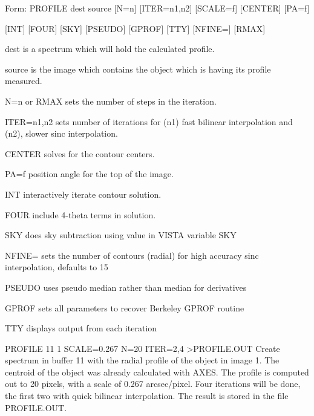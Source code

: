 {\newpage\clearpage
{}%
\begin{command}
  \item[Form: PROFILE dest source {[N=n]} {[ITER=n1,n2]} {[SCALE=f]} 
       {[CENTER]} {[PA=f]} \hfill]{}
  \item{{[INT]} {[FOUR]} {[SKY]} {[PSEUDO]} {[GPROF]} {[TTY]} {[NFINE=]} 
       {[RMAX]}}
  \item[dest]{is a spectrum which will hold the calculated profile.}
  \item[source]{is the image which contains the object which is
       having its profile measured.}
  \item[N=n or RMAX]{sets the number of steps in the iteration.}
  \item[ITER=n1,n2]{sets number of iterations for (n1) fast bilinear
       interpolation and (n2), slower sinc interpolation.}
  \item[CENTER]{solves for the contour centers.}
  \item[PA=f]{position angle for the top of the image.}
  \item[INT]{interactively iterate contour solution.}
  \item[FOUR]{include 4-theta terms in solution.}
  \item[SKY]{does sky subtraction using value in VISTA variable SKY}
  \item[NFINE=]{sets the number of contours (radial) for high accuracy 
                          sinc interpolation, defaults to 15}
  \item[PSEUDO]{uses pseudo median rather than median for derivatives}
  \item[GPROF]{sets all parameters to recover Berkeley GPROF routine}
  \item[TTY]{displays output from each iteration }
\end{command}%
\lthtmlfigureZ
\lthtmlcheckvsize\clearpage}

{\newpage\clearpage
{}%
\begin{example}
  \item[PROFILE 11 1 SCALE=0.267 N=20 ITER=2,4 >PROFILE.OUT\hfill]{Create
       spectrum in buffer 11 with the radial profile of the object in image
       1.  The centroid of the object was already calculated with AXES.
       The profile is computed out to 20 pixels, with a scale of 0.267
       arcsec/pixel.  Four iterations will be done, the first two with
       quick bilinear interpolation.  The result is stored in the file
       PROFILE.OUT.}
\end{example}%
\lthtmlfigureZ
\lthtmlcheckvsize\clearpage}

